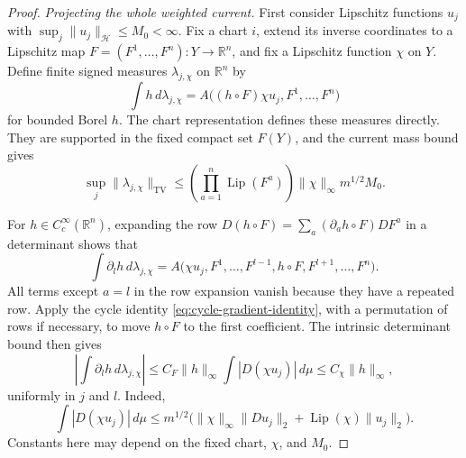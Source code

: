 \documentclass[11pt]{article}
\numberwithin{equation}{section}
\theoremstyle{definition}
\theoremstyle{remark}
\begin{document}
\begin{proof}
\emph{Projecting the whole weighted current.}
First consider Lipschitz functions $u_j$ with
$\sup_j\|u_j\|_{\mathcal H}\le M_0<\infty$.  Fix a chart $i$, extend its
inverse coordinates to a Lipschitz map $F=(F^1,\ldots,F^n):Y\to\mathbb R^n$,
and fix a Lipschitz function $\chi$ on $Y$.  Define finite signed
measures $\lambda_{j,\chi}$ on $\mathbb R^n$ by
\begin{equation}
 \int h\,d\lambda_{j,\chi}
 =A\bigl((h\circ F)\chi u_j,F^1,\ldots,F^n\bigr)
 \label{eq:projected-function-measure}
\end{equation}
for bounded Borel $h$.  The chart representation defines these
measures directly.  They are supported in the fixed compact set
$F(Y)$, and the current mass bound gives
\[
 \sup_j\|\lambda_{j,\chi}\|_{\mathrm{TV}}
 \le \left(\prod_{a=1}^n\operatorname{Lip}(F^a)\right)
       \|\chi\|_\infty m^{1/2}M_0.
\]

For $h\in C_c^\infty(\mathbb R^n)$, expanding the row
$D(h\circ F)=\sum_a(\partial_a h\circ F)DF^a$ in a determinant shows
that
\[
 \int\partial_l h\,d\lambda_{j,\chi}
 =A\bigl(\chi u_j,F^1,\ldots,F^{l-1},h\circ F,
                         F^{l+1},\ldots,F^n\bigr).
\]
All terms except $a=l$ in the row expansion vanish because they have
a repeated row.  Apply the cycle identity
\eqref{eq:cycle-gradient-identity}, with a permutation of rows if
necessary, to move $h\circ F$ to the first coefficient.  The intrinsic
determinant bound then gives
\begin{equation}
 \left|\int\partial_lh\,d\lambda_{j,\chi}\right|
 \le C_F\|h\|_\infty\int|D(\chi u_j)|\,d\mu
 \le C_\chi\|h\|_\infty,
 \label{eq:projected-measure-derivative}
\end{equation}
uniformly in $j$ and $l$.  Indeed,
\[
 \int|D(\chi u_j)|\,d\mu
 \le m^{1/2}\bigl(\|\chi\|_\infty\|Du_j\|_2
                      +\operatorname{Lip}(\chi)\|u_j\|_2\bigr).
\]
Constants here may depend on the fixed chart, $\chi$, and $M_0$.


\end{proof}
\end{document}

